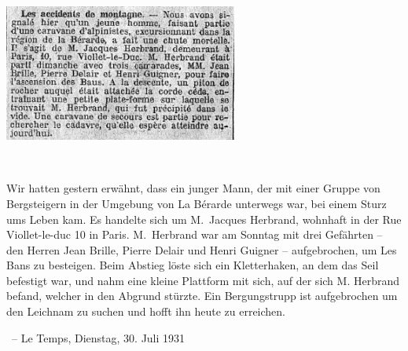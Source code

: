 \documentclass[aspectratio=1610,onlymath]{beamer}
\begin{document}
\begin{frame}[plain]\label{frame_temps_b}
\color{white}
\begin{center}
\includegraphics[height=4.5cm]{images/Le_Temps_1931-07-30_Herbrand-BnF.jpg}\bigskip

 \tt
\begin{minipage}{13.5cm}\normalsize
Wir hatten gestern erwähnt, dass ein junger Mann, der mit einer Gruppe von Bergsteigern in der Umgebung von La Bérarde unterwegs war, bei einem Sturz ums Leben kam.
Es handelte sich um M.~Jacques Herbrand, wohnhaft in der Rue Viollet-le-duc 10 in Paris. 
M.~Herbrand war am Sonntag mit drei Gefährten -- den Herren Jean Brille, Pierre Delair und Henri Guigner -- aufgebrochen, um Les Bans zu besteigen.
Beim Abstieg löste sich ein Kletterhaken, an dem das Seil befestigt war, und nahm eine kleine
Plattform mit sich, auf der sich M. Herbrand befand, welcher in den Abgrund stürzte.
Ein Bergungstrupp ist aufgebrochen um den Leichnam zu suchen und hofft ihn heute zu erreichen.
\end{minipage}

% 
\bigskip

~-- Le Temps, Dienstag, 30. Juli 1931
\end{center}
\end{frame}
\end{document}

